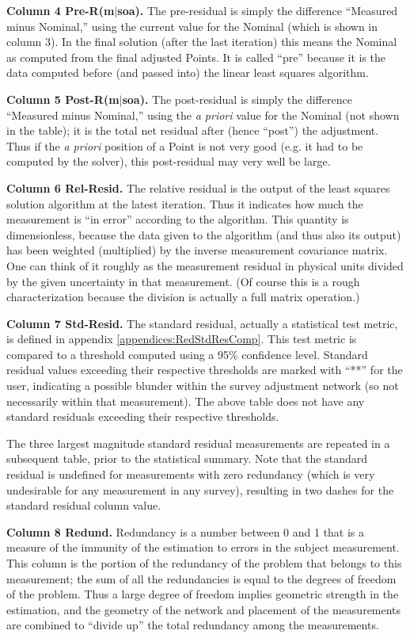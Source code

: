 \textbf{Column 4 Pre-R(m$\mid$soa).} The pre-residual is simply the difference ``Measured minus Nominal,'' using the current value for the Nominal (which is shown in column 3). In the final solution (after the last iteration) this means the Nominal as computed from the final adjusted Points. It is called ``pre'' because it is the data computed before (and passed into) the linear least squares algorithm.

\textbf{Column 5 Post-R(m$\mid$soa).} The post-residual is simply the difference ``Measured minus Nominal,'' using the \emph{a priori} value for the Nominal (not shown in the table); it is the total net residual after (hence ``post'') the adjustment. Thus if the \emph{a priori} position of a Point is not very good (e.g. it had to be computed by the solver), this post-residual may very well be large. 

\textbf{Column 6 Rel-Resid.} The relative residual is the output of the least squares solution algorithm at the latest iteration. Thus it indicates how much the measurement is ``in error'' according to the algorithm. This quantity is dimensionless, because the data given to the algorithm (and thus also its output) has been weighted (multiplied) by the inverse measurement covariance matrix. One can think of it roughly as the measurement residual in physical units divided by the given uncertainty in that measurement. (Of course this is a rough characterization because the division is actually a full matrix operation.)

\textbf{Column 7 Std-Resid.} The standard residual, actually a statistical test metric, is defined in appendix \ref{appendices:RedStdResComp}. This test metric is compared to a threshold computed using a 95\% confidence level. Standard residual values exceeding their respective thresholds are marked with ``**'' for the user, indicating a possible blunder within the survey adjustment network (so not necessarily within that measurement). The above table does not have any standard residuals exceeding their respective thresholds.

The three largest magnitude standard residual measurements are repeated in a subsequent table, prior to the statistical summary. Note that the standard residual is undefined for measurements with zero redundancy (which is very undesirable for any measurement in any survey), resulting in two dashes for the standard residual column value. 

\textbf{Column 8 Redund.} Redundancy is a number between 0 and 1 that is a measure of the immunity of the estimation to errors in the subject measurement. This column is the portion of the redundancy of the problem that belongs to this measurement; the sum of all the redundancies is equal to the degrees of freedom of the problem. Thus a large degree of freedom implies geometric strength in the estimation, and the geometry of the network and placement of the measurements are combined to ``divide up'' the total redundancy among the measurements.

